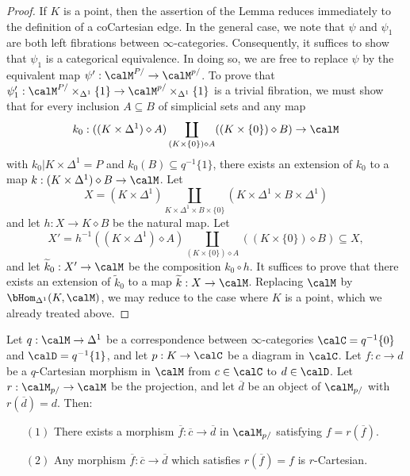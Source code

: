 \begin{proof}
If $K$ is a point, then the assertion of the Lemma reduces immediately to the definition of a coCartesian edge. In the general case, we note that
$\psi$ and $\psi_1$ are both left fibrations between $\infty$-categories. Consequently, it suffices to show that $\psi_1$ is a categorical equivalence. In doing so, we are free to replace
$\psi$ by the equivalent map $\psi': \calM^{P/} \rightarrow \calM^{p/}$. To prove that $\psi'_1:
\calM^{P/} \times_{ \Delta^1} \{1\} \rightarrow \calM^{p/} \times_{\Delta^1} \{1\}$ is a trivial fibration, we must show that for every inclusion $A \subseteq B$ of simplicial sets and any map
$$ k_0: ((K \times \Delta^1) \diamond A) \coprod_{ (K \times \{0\}) \diamond A }
((K \times \{0\}) \diamond B) \rightarrow \calM$$
with $k_0| K \times \Delta^1 = P$ and $k_0(B) \subseteq q^{-1} \{1\}$, there exists an extension
of $k_0$ to a map $k: (K \times \Delta^1) \diamond B \rightarrow \calM$. Let
$$X = (K \times \Delta^1) \coprod_{K \times \Delta^1 \times B \times \{0\}} (K \times \Delta^1 \times B \times \Delta^1)$$ and let $h: X \rightarrow K \diamond B$ be the natural map. 
Let 
$$ X' = h^{-1} ((K \times \Delta^1) \diamond A) \coprod_{ (K \times \{0\}) \diamond A }
((K \times \{0\}) \diamond B) \subseteq X,$$
and let $\widetilde{k}_0: X' \rightarrow \calM$ be the composition $k_0 \circ h$. It suffices to
prove that there exists an extension of $\widetilde{k}_0$ to a map $\widetilde{k}: X \rightarrow \calM$.
Replacing $\calM$ by $\bHom_{\Delta^1}(K,\calM)$, we may reduce to the case where $K$ is a point, which we already treated above.
\end{proof}

\begin{lemma}\label{storka}
Let $q: \calM \rightarrow \Delta^1$ be a correspondence between $\infty$-categories
$\calC = q^{-1} \{0\}$ and $\calD = q^{-1} \{1\}$, and let $p: K \rightarrow \calC$ be a diagram in $\calC$. Let $f: c \rightarrow d$ be a $q$-Cartesian morphism in $\calM$ from $c \in \calC$
to $d \in \calD$. Let $r: \calM_{p/} \rightarrow \calM$ be the projection, and let
$\overline{d}$ be an object of $\calM_{p/}$ with $r(\overline{d})=d$. Then:
\begin{itemize}
\item[$(1)$] There exists a morphism $\overline{f}: \overline{c} \rightarrow \overline{d}$
in $\calM_{p/}$ satisfying $f = r( \overline{f} )$.
\item[$(2)$] Any morphism $\overline{f}: \overline{c} \rightarrow \overline{d}$ which
satisfies $r( \overline{f}) = f$ is $r$-Cartesian.
\end{itemize}
\end{lemma}

